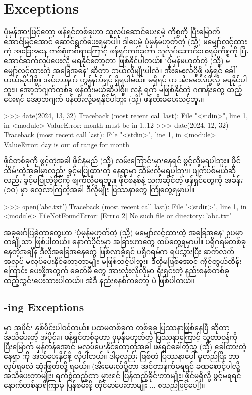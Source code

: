 \section{Exceptions}
ပုံမှန်အားဖြင့်တော့ ဖန်ရှင်တစ်ခုဟာ သူလုပ်ဆောင်ပေးရမဲ့ ကိစ္စကို ပြီးမြောက် အောင်မြင်အောင် ဆောင်\allowbreak ရွက်ပေးရမှာပါ။ ဒါပေမဲ့ ပုံမှန်မဟုတ်တဲ့ (သို့) မမျှော်လင့်ထားတဲ့ အခြေအနေ တစ်စုံတစ်ရာကြောင့် ဖန်ရှင်တစ်ခုဟာ သူလုပ်ဆောင်ပေးရမဲ့ကိစ္စကို ပြီးအောင်ဆက်လုပ်ပေးလို့ မရနိုင်တော့တာ ဖြစ်နိုင်ပါတယ်။ ‘ပုံမှန်မဟုတ်တဲ့ (သို့) မမျှော်လင့်ထားတဲ့ အခြေအနေ’ ဆိုတာ ဘယ်လိုမျိုးပါလဲ။ အီးမေးလ်ပို့ဖို့  ဖန်ရှင် ခေါ်တယ်ဆိုပါစို့။ အင်တာနက် ကွန်နက်ရှင် ရှိရပါမယ်။ မရှိရင်  က အီးမေးလ်ပို့လို့ မရနိုင်ပါဘူး။  အော့ဘ်ဂျက်တစ်ခု ဖန်တီးမယ်ဆိုပါစို့။ လနဲ့ ရက် မဖြစ်နိုင်တဲ့ ဂဏန်းတွေ ထည့်ပေးရင် အော့ဘ်ဂျက် ဖန်တီးလို့မရနိုင်ပါဘူး (သို့) ဖန်တီးမပေးသင့်ဘူး။
\begin{codetxt}
>>> date(2024, 13, 32)
Traceback (most recent call last):
  File "<stdin>", line 1, in <module>
ValueError: month must be in 1..12
>>> date(2024, 12, 32)
Traceback (most recent call last):
  File "<stdin>", line 1, in <module>
ValueError: day is out of range for month
\end{codetxt}
ဖိုင်တစ်ခုကို ဖွင့်တဲ့အခါ ဖိုင်နံမည် (သို့)  လမ်းကြောင်းမှားနေရင် ဖွင့်လို့မရပါဘူး။ ဖိုင်သိမ်းတဲ့အခါမှာလည်း ခွင့်မပြုထားတဲ့ နေရာမှာ သိမ်းလို့မရပါဘူး။ ဖျက်ပစ်မယ်ဆိုလည်း ခွင့်မပြုတဲ့ဖိုင်ကို ဖျက်လို့မရဘူး။ ဖိုင်စနစ်နဲ့ သက်ဆိုင်တဲ့ ဖန်ရှင်တွေကို အခန်း (၁၀) မှာ လေ့လာကြတဲ့အခါ ဒီလိုမျိုး ပြဿနာတွေ ကြုံတွေ့ရမှာပါ။  
\begin{codetxt}
>>> open('abc.txt')
Traceback (most recent call last):
  File "<stdin>", line 1, in <module>
FileNotFoundError: [Errno 2] No such file or directory: 'abc.txt'
\end{codetxt}

အခုဖော်ပြခဲ့တာတွေဟာ ‘ပုံမှန်မဟုတ်တဲ့ (သို့) မမျှော်လင့်ထားတဲ့ အခြေအနေ’ ဥပမာတချို့သာ ဖြစ်ပါတယ်။ နောက်ပိုင်းမှာ အခြားဟာတွေ ထပ်တွေ့ရမှာပါ။ ပရိုဂရမ်တစ်ခု  နေတဲ့အချိန် ဒီလိုအခြေအနေတွေ ဖြစ်လာခဲ့ရင် ပရိုဂရမ်က ရပ်သွားပြီး ဆက်လက် အလုပ် မလုပ်ပေးနိုင်တော့တာမျိုး မဖြစ်သင့်ပါဘူး။ ဒီလိုမဖြစ်အောင် ကိုင်တွယ်ထိန်းကြောင်း ပေးဖို့အတွက် ခေတ်မီ  တွေ အားလုံးလိုလိုမှာ ရိုးရှင်းတဲ့ နည်းစနစ်တစ်ခု ထည့်သွင်းပေးထားပါတယ်။ အဲဒီ နည်းစနစ်ကတော့  ပဲ ဖြစ်ပါတယ်။

\subsection*{ -ing Exceptions}
 မှာ အပိုင်း နှစ်ပိုင်းပါဝင်တယ်။ ပထမတစ်ခုက တစ်ခုခု ပြဿနာဖြစ်နေပြီ ဆိုတာ အသိပေးတဲ့ အပိုင်း။ ဖန်ရှင်တစ်ခုဟာ ပုံမှန်မဟုတ်တဲ့ ပြဿနာကြောင့် သူ့တာဝန်ကို ပြီးမြောက် မှန်ကန်အောင် မလုပ်ပေးနိုင်တော့တဲ့အခါ ဖန်ရှင်ခေါ်တဲ့သူ (သို့) ခေါ်ထားတဲ့နေရာ ကို အသိပေးနိုင်ဖို့ လိုပါတယ်။ ဒါမှလည်း ဖြစ်တဲ့ ပြဿနာပေါ် မူတည်ပြီး ဘာလုပ်ရမလဲ ဆုံးဖြတ်လို့ ရမယ်။ (အီးမေးလ်ပို့တာ အင်တာနက်မရရင် ခဏစောင့်ပါလို့ အသိပေးတာမျိုး၊ ရက်စွဲထည့်တာ မှားရင် ပြန်ထည့်ခိုင်းတာမျိုး၊ ဖိုင်မရှိလို့ ဖွင့်မရရင် နောက်တစ်နာရီကြာမှ ပြန်စမ်းဖို့ တိုင်မာပေးတာမျိုး $\ldots$ စသည်ဖြင့်ပေါ့)။

